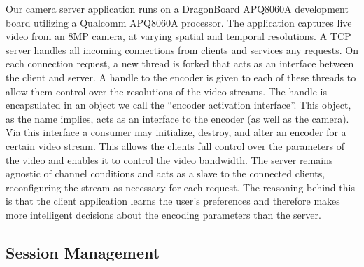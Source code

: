 \documentclass[a4paper,12pt]{article}
\begin{document}
Our camera server application runs on a DragonBoard APQ8060A development board utilizing a Qualcomm APQ8060A processor. The application captures live video from an 8MP camera, at varying spatial and temporal resolutions. A TCP server handles all incoming connections from clients and services any requests. On each connection request, a new thread is forked that acts as an interface between the client and server. A handle to the encoder is given to each of these threads to allow them control over the resolutions of the video streams. The handle is encapsulated in an object we call the ``encoder activation interface''. This object, as the name implies, acts as an interface to the encoder (as well as the camera). Via this interface a consumer may initialize, destroy, and alter an encoder for a certain video stream. This allows the clients full control over the parameters of the video and enables it to control the video bandwidth. The server remains agnostic of channel conditions and acts as a slave to the connected clients, reconfiguring the stream as necessary for each request. The reasoning behind this is that the client application learns the user’s preferences and therefore makes more intelligent decisions about the encoding parameters than the server.

\subsection{Session Management}
\end{document}
